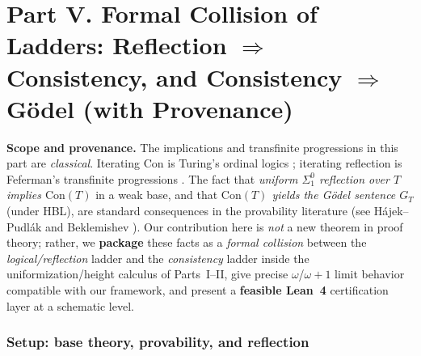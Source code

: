 \documentclass[11pt]{article}
\theoremstyle{definition}
\theoremstyle{remark}
\begin{document}

\part*{Part V. Formal Collision of Ladders: Reflection \texorpdfstring{$\Rightarrow$}{=>} Consistency, and Consistency \texorpdfstring{$\Rightarrow$}{=>} G\"odel (with Provenance)}

\providecommand{\EA}{\mathrm{EA}}
\providecommand{\ISigmaOne}{\mathrm{I}\Sigma_1}
\providecommand{\RFNSigOne}{\mathrm{RFN}_{\Sigma^0_1}}
\providecommand{\Con}{\mathrm{Con}}
\providecommand{\HA}{\mathrm{HA}}
\providecommand{\PA}{\mathrm{PA}}

\begin{mdframed}[style=status]
\textbf{Scope and provenance.}
The implications and transfinite progressions in this part are \emph{classical}.
Iterating $\Con$ is Turing’s ordinal logics \cite{Turing1939}; iterating reflection is Feferman’s
transfinite progressions \cite{Feferman1962}. The fact that \emph{uniform $\Sigma^0_1$ reflection over $T$ implies $\Con(T)$} in a weak base,
and that \emph{$\Con(T)$ yields the G\"odel sentence $G_T$} (under HBL),
are standard consequences in the provability literature (see H\'ajek--Pudl\'ak \cite{HajekPudlak}
and Beklemishev \cite{Beklemishev2003,Beklemishev2004}). Our contribution here is \emph{not} a new theorem
in proof theory; rather, we \textbf{package} these facts as a \emph{formal collision} between the
\emph{logical/reflection} ladder and the \emph{consistency} ladder inside the uniformization/height calculus of Parts~I–II,
give precise \(\omega\)/\(\omega{+}1\) limit behavior compatible with our framework,
and present a \textbf{feasible Lean~4} certification layer at a schematic level.
\end{mdframed}

\section{Setup: base theory, provability, and reflection}
\end{document}
